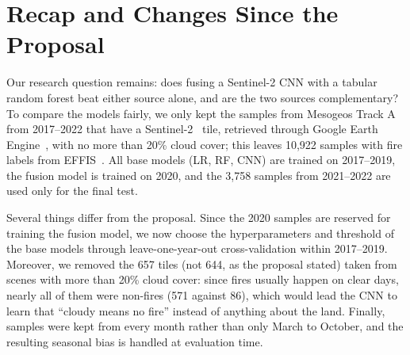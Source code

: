 \section{Recap and Changes Since the Proposal}
\label{sec:recap}




Our research question remains: does fusing a Sentinel-2 CNN with a tabular random forest beat either source alone, and are the two sources complementary? To compare the models fairly, we only kept the samples from Mesogeos Track A~\cite{kondylatos2023mesogeos} from 2017--2022 that have a Sentinel-2~\cite{drusch2012sentinel2} tile, retrieved through Google Earth Engine~\cite{gorelick2017gee}, with no more than 20\% cloud cover; this leaves 10,922 samples with fire labels from EFFIS~\cite{effis}. All base models (LR, RF, CNN) are trained on 2017--2019, the fusion model is trained on 2020, and the 3,758 samples from 2021--2022 are used only for the final test.

Several things differ from the proposal. Since the 2020 samples are reserved for training the fusion model, we now choose the hyperparameters and threshold of the base models through leave-one-year-out cross-validation within 2017--2019. Moreover, we removed the 657 tiles (not 644, as the proposal stated) taken from scenes with more than 20\% cloud cover: since fires usually happen on clear days, nearly all of them were non-fires (571 against 86), which would lead the CNN to learn that ``cloudy means no fire'' instead of anything about the land. Finally, samples were kept from every month rather than only March to October, and the resulting seasonal bias is handled at evaluation time.
